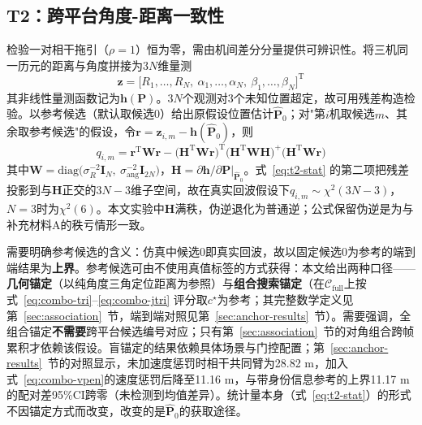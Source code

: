 \documentclass[UTF8,a4paper,zihao=-4]{ctexart}
\begin{document}
\subsection{T2：跨平台角度-距离一致性}\label{sec:t2}
检验一对相干拖引（\(\rho=1\)）恒为零，需由机间差分分量提供可辨识性。将三机同一历元的距离与角度拼接为\(3N\)维量测
\begin{equation}
\boldsymbol z=\bigl[R_1,\ldots,R_N,\ \alpha_1,\ldots,\alpha_N,\ \beta_1,\ldots,\beta_N\bigr]^{\mathrm T}
\label{eq:t2-z}
\end{equation}
其非线性量测函数记为\(\boldsymbol h(\boldsymbol P)\)。\(3N\)个观测对3个未知位置超定，故可用残差构造检验。以参考候选（默认取候选0）给出原假设位置估计\(\hat{\boldsymbol P}_0\)；对"第\(i\)机取候选\(m\)、其余取参考候选"的假设，令\(\boldsymbol r=\boldsymbol z_{i,m}-\boldsymbol h(\hat{\boldsymbol P}_0)\)，则
\begin{equation}
q_{i,m}=\boldsymbol r^{\mathrm T}\boldsymbol W\boldsymbol r-\bigl(\boldsymbol H^{\mathrm T}\boldsymbol W\boldsymbol r\bigr)^{\mathrm T}\bigl(\boldsymbol H^{\mathrm T}\boldsymbol W\boldsymbol H\bigr)^{+}\bigl(\boldsymbol H^{\mathrm T}\boldsymbol W\boldsymbol r\bigr)
\label{eq:t2-stat}
\end{equation}
其中\(\boldsymbol W=\mathrm{diag}\bigl(\sigma_R^{-2}\boldsymbol I_N,\ \sigma_{\mathrm{ang}}^{-2}\boldsymbol I_{2N}\bigr)\)，\(\boldsymbol H=\partial\boldsymbol h/\partial\boldsymbol P\big|_{\hat{\boldsymbol P}_0}\)。式~\eqref{eq:t2-stat} 的第二项把残差投影到与\(\boldsymbol H\)正交的\(3N-3\)维子空间，故在真实回波假设下\(q_{i,m}\sim\chi^2(3N-3)\)，\(N=3\)时为\(\chi^2(6)\)。本文实验中\(\boldsymbol H\)满秩，伪逆退化为普通逆；公式保留伪逆是为与补充材料A的秩亏情形一致。

需要明确参考候选的含义：仿真中候选0即真实回波，故以固定候选0为参考的端到端结果为\textbf{上界}。参考候选可由不使用真值标签的方式获得：本文给出两种口径——\textbf{几何锚定}（以纯角度三角定位距离为参照）与\textbf{组合搜索锚定}（在\(\mathcal C_{\mathrm{full}}\)上按式~\eqref{eq:combo-tri}--\eqref{eq:combo-jtri} 评分取\(c^\star\)为参考；其完整数学定义见第~\ref{sec:association}~节，端到端对照见第~\ref{sec:anchor-results}~节）。需要强调，全组合锚定\textbf{不需要}跨平台候选编号对应；只有第~\ref{sec:association}~节的对角组合跨帧累积才依赖该假设。盲锚定的结果依赖具体场景与门控配置；第~\ref{sec:anchor-results}~节的对照显示，未加速度惩罚时相干共同臂为28.82 m，加入式~\eqref{eq:combo-vpen}的速度惩罚后降至11.16 m，与带身份信息参考的上界11.17 m的配对差95\%CI跨零（未检测到均值差异）。统计量本身（式~\eqref{eq:t2-stat}）的形式不因锚定方式而改变，改变的是\(\hat{\boldsymbol P}_0\)的获取途径。
\end{document}
